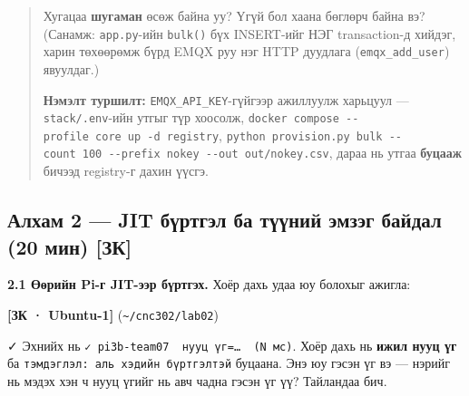 \begin{quote}
Хугацаа \textbf{шугаман} өсөж байна уу? Үгүй бол хаана бөглөрч байна вэ? (Санамж: \texttt{app.py}-ийн \texttt{bulk()} бүх INSERT-ийг НЭГ transaction-д хийдэг, харин төхөөрөмж бүрд EMQX руу нэг HTTP дуудлага (\texttt{emqx\_\allowbreak{}add\_\allowbreak{}user}) явуулдаг.)

\textbf{Нэмэлт туршилт:} \texttt{EMQX\_\allowbreak{}API\_\allowbreak{}KEY}-гүйгээр ажиллуулж харьцуул --- \texttt{stack/.env}-ийн утгыг түр хоосолж, \texttt{docker\ compose\ -\/\allowbreak{}-profile\ core\ up\ -d\ registry}, \texttt{python\ provision.\allowbreak{}py\ bulk\ -\/\allowbreak{}-count\ 100\ -\/\allowbreak{}-prefix\ nokey\ -\/\allowbreak{}-out\ out/\allowbreak{}nokey.\allowbreak{}csv}, дараа нь утгаа \textbf{буцааж} бичээд registry-г дахин үүсгэ.
\end{quote}

\hypertarget{ux430ux43bux445ux430ux43c-2-jit-ux431ux4afux440ux442ux433ux44dux43b-ux431ux430-ux442ux4afux4afux43dux438ux439-ux44dux43cux437ux44dux433-ux431ux430ux439ux434ux430ux43b-20-ux43cux438ux43d-ux437ux43a}{%
\subsection{Алхам 2 --- JIT бүртгэл ба түүний эмзэг байдал (20 мин) {[}ЗК{]}}\label{ux430ux43bux445ux430ux43c-2-jit-ux431ux4afux440ux442ux433ux44dux43b-ux431ux430-ux442ux4afux4afux43dux438ux439-ux44dux43cux437ux44dux433-ux431ux430ux439ux434ux430ux43b-20-ux43cux438ux43d-ux437ux43a}}

\textbf{2.1 Өөрийн Pi-г JIT-ээр бүртгэх.} Хоёр дахь удаа юу болохыг ажигла:

\textbf{{[}ЗК · Ubuntu-1{]}} (\texttt{\textasciitilde{}/cnc302/lab02})

\begin{Shaded}
\begin{Highlighting}[]
 \KeywordTok{|} 
 \KeywordTok{|} 
\end{Highlighting}
\end{Shaded}

✓ Эхнийх нь \texttt{✓\ pi3b-team07\ \ нууц\ үг=\allowbreak{}\ldots{}\ \ (N\ мс)}. Хоёр дахь нь \textbf{ижил нууц үг} ба \texttt{тэмдэглэл:\allowbreak{}\ аль\ хэдийн\ бүртгэлтэй} буцаана. Энэ юу гэсэн үг вэ --- нэрийг нь мэдэх хэн ч нууц үгийг нь авч чадна гэсэн үг үү? Тайландаа бич.

